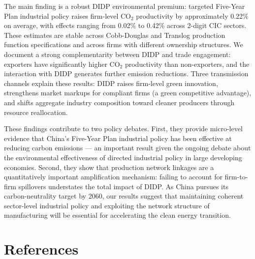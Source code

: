 \documentclass[11pt,a4paper]{article}
\begin{document}
The main finding is a robust DIDP environmental premium: targeted Five-Year Plan industrial policy raises firm-level CO$_2$ productivity by approximately 0.22\% on average, with effects ranging from 0.02\% to 0.42\% across 2-digit CIC sectors. These estimates are stable across Cobb-Douglas and Translog production function specifications and across firms with different ownership structures. We document a strong complementarity between DIDP and trade engagement: exporters have significantly higher CO$_2$ productivity than non-exporters, and the interaction with DIDP generates further emission reductions. Three transmission channels explain these results: DIDP raises firm-level green innovation, strengthens market markups for compliant firms (a green competitive advantage), and shifts aggregate industry composition toward cleaner producers through resource reallocation.

These findings contribute to two policy debates. First, they provide micro-level evidence that China's Five-Year Plan industrial policy has been effective at reducing carbon emissions --- an important result given the ongoing debate about the environmental effectiveness of directed industrial policy in large developing economies. Second, they show that production network linkages are a quantitatively important amplification mechanism: failing to account for firm-to-firm spillovers understates the total impact of DIDP. As China pursues its carbon-neutrality target by 2060, our results suggest that maintaining coherent sector-level industrial policy and exploiting the network structure of manufacturing will be essential for accelerating the clean energy transition.

\section*{References}
\end{document}
